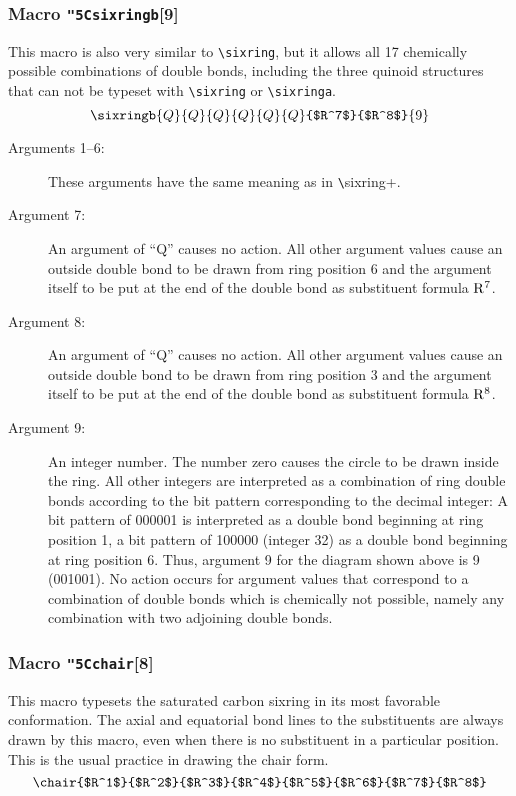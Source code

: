 \subsubsection{Macro {\tt\char"5C{}sixringb}[9]}
  This macro is also very similar to \verb+\sixring+, but it
 allows all 17 chemically possible combinations of double bonds,
 including the three quinoid structures that can not be typeset
 with \verb+\sixring+ or \verb+\sixringa+.
 \[ \sixringb{Q}{Q}{Q}{Q}{Q}{Q}{$R^7$}{$R^8$}{9}  \]
 
 \begin{description}
 \item[{\rm Arguments 1--6:}] These arguments have the
      same meaning as in \verb+\+sixring+.
 \item[{\rm Argument 7:}] An argument of ``Q'' causes
      no action. All other argument values cause an outside
      double bond to be drawn from ring position 6 and the
      argument itself to be put at the end of the double bond
      as substituent formula ${\rm R^7}$.
 \item[{\rm Argument 8:}] An argument of ``Q'' causes
      no action. All other argument values cause an outside
      double bond to be drawn from ring position 3 and the
      argument itself to be put at the end of the double bond
      as substituent formula ${\rm R^8}$.
 \item[{\rm Argument 9:}] An integer number. The number
      zero causes the circle to be drawn inside the ring.
      All other integers are interpreted as a combination of
      ring double bonds according to the bit pattern corresponding
      to the decimal integer: A bit pattern of 000001 is interpreted
      as a double bond beginning at ring position 1, a bit pattern
      of 100000 (integer 32) as a double bond beginning at ring
      position 6. Thus, argument 9 for the diagram shown above
      is 9 (001001).
      No action occurs for argument values that correspond to
      a combination of double bonds which is chemically not
      possible, namely any combination with two adjoining
      double bonds.
 \end{description}
 
\subsubsection{Macro {\tt\char"5C{}chair}[8]}
  This macro typesets the saturated carbon sixring in its most
 favorable conformation. The axial and equatorial bond lines
 to the substituents are always drawn by this macro, even when
 there is no substituent in a particular position. This is the
 usual practice in drawing the chair form.
 \[ \chair{$R^1$}{$R^2$}{$R^3$}{$R^4$}{$R^5$}{$R^6$}{$R^7$}{$R^8$} \]
 
